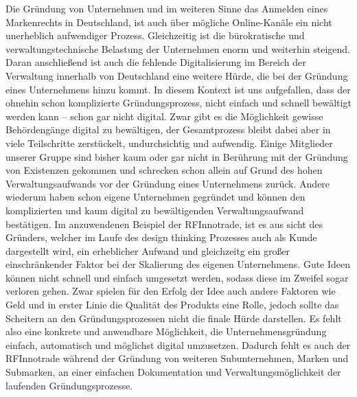 Die Gründung von Unternehmen und im weiteren Sinne das Anmelden eines Markenrechts in Deutschland, ist auch über mögliche Online-Kanäle ein nicht unerheblich aufwendiger Prozess.
Gleichzeitig ist die bürokratische und verwaltungstechnische Belastung der Unternehmen enorm und weiterhin steigend. Daran anschließend ist auch die fehlende Digitalisierung im Bereich der Verwaltung innerhalb von Deutschland eine weitere Hürde, die bei der Gründung eines Unternehmens hinzu kommt.
In diesem Kontext ist uns aufgefallen, dass der ohnehin schon komplizierte Gründungsprozess, nicht einfach und schnell bewältigt werden kann – schon gar nicht digital. Zwar gibt es die Möglichkeit gewisse Behördengänge digital zu bewältigen, der Gesamtprozess bleibt dabei aber in viele Teilschritte zerstückelt, undurchsichtig und aufwendig.
Einige Mitglieder unserer Gruppe sind bisher kaum oder gar nicht in Berührung mit der Gründung von Existenzen gekommen und schrecken schon allein auf Grund des hohen Verwaltungsaufwands vor der Gründung eines Unternehmens zurück. Andere wiederum haben schon eigene Unternehmen gegründet und können den komplizierten und kaum digital zu bewältigenden Verwaltungsaufwand bestätigen.
Im anzuwendenen Beispiel der RFInnotrade, ist es aus sicht des Gründers, welcher im Laufe des design thinking Prozesses auch als Kunde dargestellt wird, ein erheblicher Aufwand und gleichzeitg ein großer einschränkender Faktor bei der Skalierung des eigenen Unternehmens. Gute Ideen können nicht schnell und einfach umgesetzt werden, sodass diese im Zweifel sogar verloren gehen.
Zwar spielen für den Erfolg der Idee auch andere Faktoren wie Geld und in erster Linie die Qualität des Produkts eine Rolle, jedoch sollte das Scheitern an den Gründungsprozessen nicht die finale Hürde darstellen.
Es fehlt also eine konkrete und anwendbare Möglichkeit, die Unternehmensgründung einfach, automatisch und möglichst digital umzusetzen. Dadurch fehlt es auch der RFInnotrade während der Gründung von weiteren Subunternehmen, Marken und Submarken, an einer einfachen Dokumentation und Verwaltungsmöglichkeit der laufenden Gründungsprozesse.